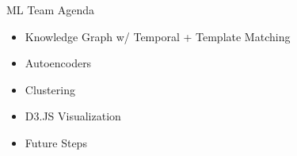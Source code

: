 




\begin{frame}{ML Team Agenda}
    \begin{itemize}
        \item Knowledge Graph w/ Temporal + Template Matching
        \item Autoencoders
        \item Clustering
        \item D3.JS Visualization
        \item Future Steps
    \end{itemize}
\end{frame}


